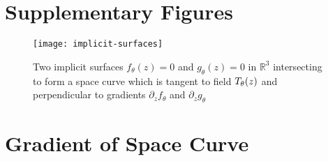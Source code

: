 \section{Supplementary Figures}

\begin{figure}[H]
\centering
\texttt{[image: implicit-surfaces]}
\caption{Two implicit surfaces $f_{\theta}(z)=0$ and $g_{\theta}(z)=0$ in $\mathbb{R}^3$ intersecting to form a space curve which is tangent to field $T_{\theta}(z)$ and perpendicular to gradients $\partial_{z}f_{\theta}$ and $\partial_{z}g_{\theta}$}
\label{fig:implicit-surfaces}
\end{figure}

\section{Gradient of Space Curve}
\label{appendix:space-curve}

